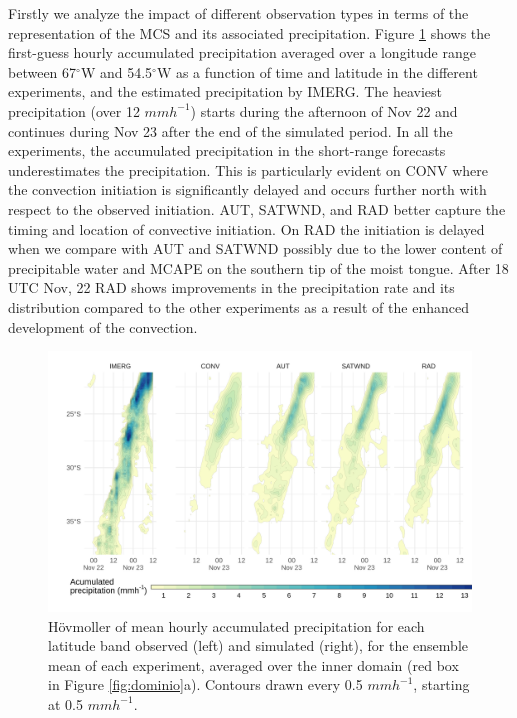 \documentclass[final,5p,times,twocolumn,authoryear]{elsarticle} %
\begin{document}
Firstly we analyze the impact of different observation types in terms of the representation of the MCS and its associated precipitation. Figure \ref{fig:pp-hov} shows the first-guess hourly accumulated precipitation averaged over a longitude range between 67\(^{\circ}\)W and 54.5\(^{\circ}\)W as a function of time and latitude in the different experiments, and the estimated precipitation by IMERG. The heaviest precipitation (over 12 \(mmh^{-1}\)) starts during the afternoon of Nov 22 and continues during Nov 23 after the end of the simulated period. In all the experiments, the accumulated precipitation in the short-range forecasts underestimates the precipitation. This is particularly evident on CONV where the convection initiation is significantly delayed and occurs further north with respect to the observed initiation. AUT, SATWND, and RAD better capture the timing and location of convective initiation. On RAD the initiation is delayed when we compare with AUT and SATWND possibly due to the lower content of precipitable water and MCAPE on the southern tip of the moist tongue. After 18 UTC Nov, 22 RAD shows improvements in the precipitation rate and its distribution compared to the other experiments as a result of the enhanced development of the convection.



\begin{figure}[h]
\includegraphics{../figures/pp-hov-1} \caption{Hövmoller of mean hourly accumulated precipitation for each latitude band observed (left) and simulated (right), for the ensemble mean of each experiment, averaged over the inner domain (red box in Figure \ref{fig:dominio}a). Contours drawn every 0.5 \(mmh^{-1}\), starting at 0.5 \(mmh^{-1}\).}\label{fig:pp-hov}
\end{figure}
\end{document}

